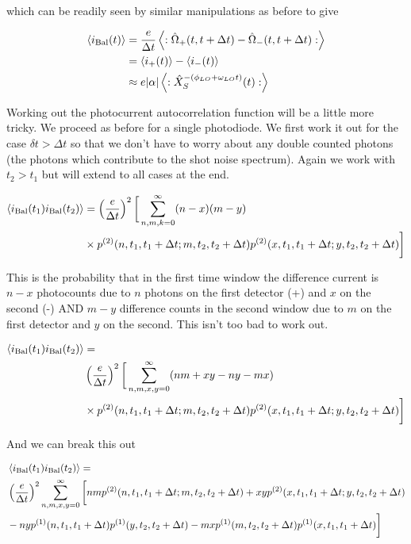 \documentclass[12pt]{article}
\begin{document}
which can be readily seen by similar manipulations as before to give

\begin{align}
\braket{i_{\text{Bal}}(t)} &= \frac{e}{\Delta t} \left<:\hat{\Omega}_+(t,t+\Delta t) - \hat{\Omega}_-(t,t+\Delta t) :\right>\\
&= \braket{i_+(t)}-\braket{i_-(t)}\\
&\approx e|\alpha|\left<:\hat{X}_{S}^{-(\phi_{LO}+\omega_{LO}t)}(t):\right>
\end{align}

Working out the photocurrent autocorrelation function will be a little more tricky. We proceed as before for a single photodiode. We first work it out for the case $\delta t>\Delta t$ so that we don't have to worry about any double counted photons (the photons which contribute to the shot noise spectrum). Again we work with $t_2>t_1$ but will extend to all cases at the end.

\begin{align}
\braket{i_{\text{Bal}}(t_1)i_{\text{Bal}}(t_2)} &= \left(\frac{e}{\Delta t}\right)^2 \bigg[ \sum_{n,m,k=0}^{\infty} (n-x)(m-y)\\
&\times p^{(2)}(n,t_1,t_1+\Delta t;m,t_2,t_2+\Delta t) p^{(2)}(x,t_1,t_1+\Delta t;y,t_2,t_2+\Delta t)\bigg]
\end{align}

This is the probability that in the first time window the difference current is $n-x$ photocounts due to $n$ photons on the first detector (+) and $x$ on the second (-) AND $m-y$ difference counts in the second window due to $m$ on the first detector and $y$ on the second. This isn't too bad to work out.

\begin{align}
\braket{i_{\text{Bal}}(t_1)i_{\text{Bal}}(t_2)} &= \\
&\left(\frac{e}{\Delta t}\right)^2 \bigg[ \sum_{n,m,x,y=0}^{\infty} (nm + xy - ny - mx)\\
&\times p^{(2)}(n,t_1,t_1+\Delta t;m,t_2,t_2+\Delta t) p^{(2)}(x,t_1,t_1+\Delta t;y,t_2,t_2+\Delta t)\bigg]
\end{align}

And we can break this out

\begin{align}
&\braket{i_{\text{Bal}}(t_1)i_{\text{Bal}}(t_2)} = \\
&\left(\frac{e}{\Delta t}\right)^2 \sum_{n,m,x,y=0}^{\infty} \bigg[ nm  p^{(2)}(n,t_1,t_1+\Delta t;m,t_2,t_2+\Delta t) + xy p^{(2)}(x,t_1,t_1+\Delta t;y,t_2,t_2+\Delta t)\\
&- ny p^{(1)}(n,t_1,t_1+\Delta t) p^{(1)}(y,t_2,t_2+\Delta t)
- mx p^{(1)}(m,t_2,t_2+\Delta t) p^{(1)}(x,t_1,t_1+\Delta t)\bigg]
\end{align}
\end{document}
